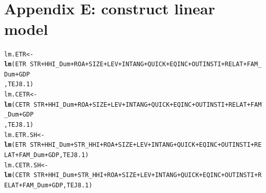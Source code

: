 \documentclass[a4paper]{article}\usepackage[]{graphicx}\usepackage[]{color}
\makeatletter
\newcommand{\hlopt}[1]{\textcolor[rgb]{0,0,0}{#1}}%
\newcommand{\hlstd}[1]{\textcolor[rgb]{0.345,0.345,0.345}{#1}}%
\newcommand{\hlkwb}[1]{\textcolor[rgb]{0.69,0.353,0.396}{#1}}%
\newcommand{\hlkwd}[1]{\textcolor[rgb]{0.737,0.353,0.396}{\textbf{#1}}}%
\newenvironment{kframe}{%
 \def\at@end@of@kframe{}%
 \ifinner\ifhmode%
  \def\at@end@of@kframe{\end{minipage}}%
  \begin{minipage}{\columnwidth}%
 \fi\fi%
 \def\FrameCommand##1{\hskip\@totalleftmargin \hskip-\fboxsep
 \colorbox{shadecolor}{##1}\hskip-\fboxsep
     \hskip-\linewidth \hskip-\@totalleftmargin \hskip\columnwidth}%
 \MakeFramed {\advance\hsize-\width
   \@totalleftmargin\z@ \linewidth\hsize
   \@setminipage}}%
 {\par\unskip\endMakeFramed%
 \at@end@of@kframe}
\newenvironment{knitrout}{}{} %
\makeatother
\begin{document}
\newpage
\section{\\Appendix E: construct linear model} \label{App:Appendix E}
\begin{knitrout}
\color{fgcolor}\begin{kframe}
\begin{alltt}
\hlstd{lm.ETR} \hlkwb{<-} \hlkwd{lm}\hlstd{(ETR} \hlopt{~} \hlstd{STR}\hlopt{+}\hlstd{HHI_Dum}\hlopt{+}\hlstd{ROA}\hlopt{+}\hlstd{SIZE}\hlopt{+}\hlstd{LEV}\hlopt{+}\hlstd{INTANG}\hlopt{+}\hlstd{QUICK}\hlopt{+}\hlstd{EQINC}\hlopt{+}\hlstd{OUTINSTI}\hlopt{+}\hlstd{RELAT}\hlopt{+}\hlstd{FAM_Dum}\hlopt{+}\hlstd{GDP}
            \hlstd{,TEJ8.1)}
\hlstd{lm.CETR} \hlkwb{<-} \hlkwd{lm}\hlstd{(CETR} \hlopt{~} \hlstd{STR}\hlopt{+}\hlstd{HHI_Dum}\hlopt{+}\hlstd{ROA}\hlopt{+}\hlstd{SIZE}\hlopt{+}\hlstd{LEV}\hlopt{+}\hlstd{INTANG}\hlopt{+}\hlstd{QUICK}\hlopt{+}\hlstd{EQINC}\hlopt{+}\hlstd{OUTINSTI}\hlopt{+}\hlstd{RELAT}\hlopt{+}\hlstd{FAM_Dum}\hlopt{+}\hlstd{GDP}
             \hlstd{,TEJ8.1)}
\hlstd{lm.ETR.SH} \hlkwb{<-} \hlkwd{lm}\hlstd{(ETR} \hlopt{~} \hlstd{STR}\hlopt{+}\hlstd{HHI_Dum}\hlopt{+}\hlstd{STR_HHI}\hlopt{+}\hlstd{ROA}\hlopt{+}\hlstd{SIZE}\hlopt{+}\hlstd{LEV}\hlopt{+}\hlstd{INTANG}\hlopt{+}\hlstd{QUICK}\hlopt{+}\hlstd{EQINC}\hlopt{+}\hlstd{OUTINSTI}\hlopt{+}\hlstd{RELAT}\hlopt{+}\hlstd{FAM_Dum}\hlopt{+}\hlstd{GDP,TEJ8.1)}
\hlstd{lm.CETR.SH} \hlkwb{<-} \hlkwd{lm}\hlstd{(CETR} \hlopt{~} \hlstd{STR}\hlopt{+}\hlstd{HHI_Dum}\hlopt{+}\hlstd{STR_HHI}\hlopt{+}\hlstd{ROA}\hlopt{+}\hlstd{SIZE}\hlopt{+}\hlstd{LEV}\hlopt{+}\hlstd{INTANG}\hlopt{+}\hlstd{QUICK}\hlopt{+}\hlstd{EQINC}\hlopt{+}\hlstd{OUTINSTI}\hlopt{+}\hlstd{RELAT}\hlopt{+}\hlstd{FAM_Dum}\hlopt{+}\hlstd{GDP,TEJ8.1)}
\end{alltt}
\end{kframe}
\end{knitrout}

\newpage
\end{document}
